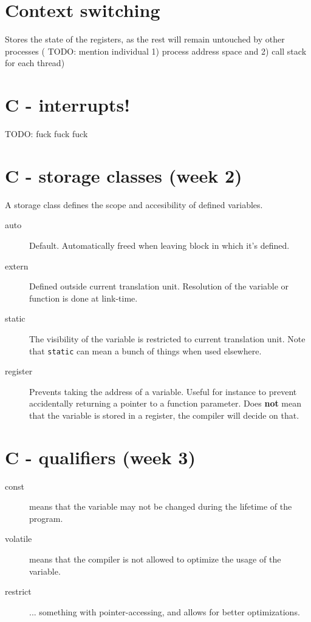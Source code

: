 \documentclass{article}
\begin{document}
\section*{Context switching}
Stores the state of the registers, as the rest will remain untouched by other processes (
TODO: mention individual 1) process address space and 2) call stack for each thread)


\section*{C - interrupts!}
TODO: fuck fuck fuck


\section*{C - storage classes (week 2)}
\label{sec:c-storage}
A storage class defines the scope and accesibility of defined variables.
\begin{description}
\item[auto] Default. Automatically freed when leaving block in which it's defined.
\item[extern] Defined outside current translation unit. Resolution of the variable or function is done at link-time.
\item[static] The visibility of the variable is restricted to current translation unit. Note that \texttt{static} can mean a bunch of things when used elsewhere.
\item[register] Prevents taking the address of a variable. Useful for instance to prevent accidentally returning a pointer to a function parameter. Does \textbf{not} mean that the variable is stored in a register, the compiler will decide on that.
\end{description}


\section*{C - qualifiers (week 3)}
\begin{description}
	\item[const] means that the variable may not be changed during the lifetime of the program.
	\item[volatile] means that the compiler is not allowed to optimize the usage of the variable.
	\item[restrict] ... something with pointer-accessing, and allows for better optimizations.
\end{description}
\end{document}
